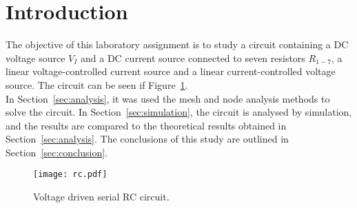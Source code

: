 \section{Introduction}
\label{sec:introduction}

The objective of this laboratory assignment is to study a circuit containing a
DC voltage source $V_I$ and a DC current source connected to seven resistors $R_{1-7}$, a linear voltage-controlled current source and a  linear current-controlled voltage source. The circuit can be seen if Figure~\ref{fig:rc}.\\


In Section~\ref{sec:analysis}, it was used the mesh and node analysis methods to solve the circuit. In Section~\ref{sec:simulation}, the circuit is analysed by
simulation, and the results are compared to the theoretical results obtained in
Section~\ref{sec:analysis}. The conclusions of this study are outlined in
Section~\ref{sec:conclusion}.

\begin{figure}[h] \centering
\texttt{[image: rc.pdf]}
\caption{Voltage driven serial RC circuit.}
\label{fig:rc}
\end{figure}

